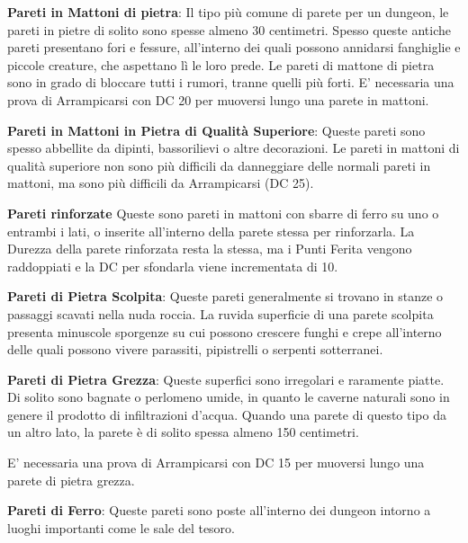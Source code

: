 \begin{multicols}{2}

\textbf{Pareti in Mattoni di pietra}: Il tipo più comune di parete per un dungeon, le pareti in pietre di solito sono spesse almeno 30 centimetri. Spesso queste antiche pareti presentano fori e fessure, all'interno dei quali possono annidarsi fanghiglie e piccole creature, che aspettano lì le loro prede. Le pareti di mattone di pietra sono in grado di bloccare tutti i rumori, tranne quelli più forti. E' necessaria una prova di Arrampicarsi con DC 20 per muoversi lungo una parete in mattoni.

\textbf{Pareti in Mattoni in Pietra di Qualità Superiore}: Queste pareti sono spesso abbellite da dipinti, bassorilievi o altre decorazioni. Le pareti in mattoni di qualità superiore non sono più difficili da danneggiare delle normali pareti in mattoni, ma sono più difficili da Arrampicarsi (DC 25).

\textbf{Pareti rinforzate} Queste sono pareti in mattoni con sbarre di ferro su uno o entrambi i lati, o inserite all'interno della parete stessa per rinforzarla. La Durezza della parete rinforzata resta la stessa, ma i Punti Ferita vengono raddoppiati e la DC per sfondarla viene incrementata di 10.

\textbf{Pareti di Pietra Scolpita}: Queste pareti generalmente si trovano in stanze o passaggi scavati nella nuda roccia. La ruvida superficie di una parete scolpita presenta minuscole sporgenze su cui possono crescere funghi e crepe all'interno delle quali possono vivere parassiti, pipistrelli o serpenti sotterranei.


\textbf{Pareti di Pietra Grezza}: Queste superfici sono irregolari e raramente piatte. Di solito sono bagnate o perlomeno umide, in quanto le caverne naturali sono in genere il prodotto di infiltrazioni d'acqua. Quando una parete di questo tipo da un altro lato, la parete è di solito spessa almeno 150 centimetri.

E' necessaria una prova di Arrampicarsi con DC 15 per muoversi lungo una parete di pietra grezza.

\textbf{Pareti di Ferro}: Queste pareti sono poste all'interno dei dungeon intorno a luoghi importanti come le sale del tesoro.


\end{multicols}
